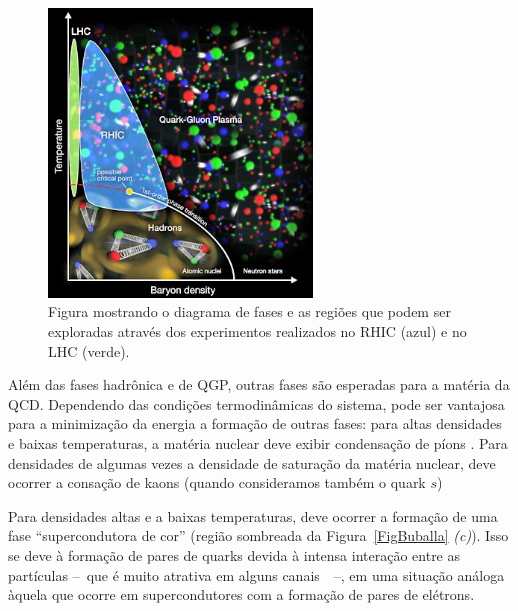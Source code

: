 \begin{figure}[!htb]
	\centering
	\includegraphics[width=7cm]{Figures/critical-point.jpg}
	\caption{Figura mostrando o diagrama de fases e as regiões que podem ser exploradas através dos experimentos realizados no RHIC (azul) e no LHC (verde).\label{FigRHIC}}
\end{figure}


Além das fases hadrônica e de QGP, outras fases são esperadas para a matéria da QCD. Dependendo das condições termodinâmicas do sistema, pode ser vantajosa para a minimização da energia a formação de outras fases: para altas densidades e baixas temperaturas, a matéria nuclear deve exibir condensação de píons \parencite{Glendenning,Schaefer}. Para densidades de algumas vezes a densidade de saturação da matéria nuclear, deve ocorrer a consação de kaons (quando consideramos também o quark $s$)

Para densidades altas e a baixas temperaturas, deve ocorrer a formação de uma fase ``supercondutora de cor'' (região sombreada da Figura~\ref{FigBuballa} \emph{(c)}). Isso se deve à formação de pares de quarks devida à intensa interação entre as partículas --~que é muito atrativa em alguns canais~\parencite{Weber}~--, em uma situação análoga àquela que ocorre em supercondutores com a formação de pares de elétrons.

